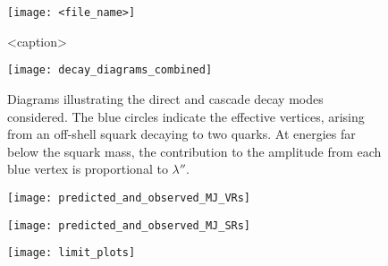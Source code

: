 
\begin{figure}[h]
\texttt{[image: <file\_name>]}
\caption{<caption>}
\label{fig:<figure_label>}
\end{figure}



\begin{figure}[h]
\texttt{[image: decay\_diagrams\_combined]}
\caption{Diagrams illustrating the direct and cascade decay modes considered. The blue circles indicate the effective vertices, arising from an off-shell squark decaying to two quarks. At energies far below the squark mass, the contribution to the amplitude from each blue vertex is proportional to $\lambda''$.}
\label{fig:decay_diagrams}
\end{figure}




\begin{figure}[h]
\texttt{[image: predicted\_and\_observed\_MJ\_VRs]}
\caption{}
\label{fig:pred_obs_MJ_VRs}
\end{figure}

\begin{figure}[h]
\texttt{[image: predicted\_and\_observed\_MJ\_SRs]}
\caption{}
\label{fig:pred_obs_MJ_SRs}
\end{figure}

\begin{figure}[h]
\texttt{[image: limit\_plots]}
\caption{}
\label{fig:limits}
\end{figure}
